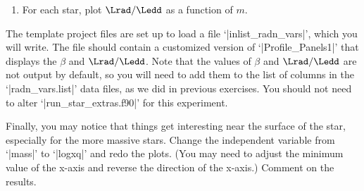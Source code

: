 \begin{mesaproject}
\begin{enumerate}
\item For each star, plot $\Lrad/\Ledd$ as a function of $m$.
\end{enumerate}
The template project files are set up to load a file `|inlist_radn_vars|', which you will write.  The file should contain a customized version of `|Profile_Panels1|' that displays the $\beta$ and $\Lrad/\Ledd$. Note that the values of $\beta$ and $\Lrad/\Ledd$ are not output by default, so you will need to add them to the list of columns in the `|radn_vars.list|' data files, as we did in previous exercises. You should not need to alter `|run_star_extras.f90|' for this experiment.

Finally, you may notice that things get interesting near the surface of the star, especially for the more massive stars.  Change the independent variable from `|mass|' to `|logxq|' and redo the plots. (You may need to adjust the minimum value of the x-axis and reverse the direction of the x-axis.) Comment on the results.
\end{mesaproject}
\UndefineShortVerb{\|}
